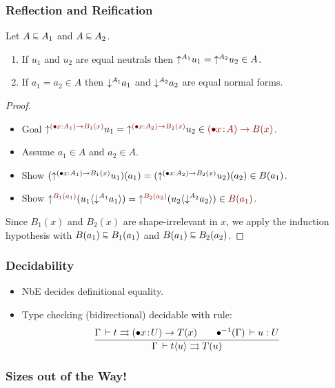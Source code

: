 \documentclass[t]{beamer}
\newcommand{\irr}{\mathord{\bullet}}
\renewcommand{\erhyp}[3][\irr]{#1#2 \of #3}
\renewcommand{\erfunT}[4][\irr]{(\erhyp[#1]{#2}{#3}) \to #4}
\newcommand{\serfunT}[4][\irr]{(#1#2 : #3) \to #4}
\renewcommand{\resurrect}[1]{\irr^{-1}(#1)}
\begin{document}
\begin{frame}%
  \frametitle{Reflection and Reification}
  \begin{theorem}
    Let $A \shape A_1$ and $A \shape A_2$.
    \begin{enumerate}
    \item If $u_1$ and $u_2$ are equal neutrals then $\mathord{\uparrow^{A_1}} u_1 = \mathord{\uparrow^{A_2}} u_2 \in A$.
    \item If $a_1 = a_2 \in A$ then $\mathord{\downarrow^{A_1}} a_1$ and $\mathord{\downarrow^{A_2}} a_2$ are equal normal forms.
    \end{enumerate}
  \end{theorem}
  \begin{proof}
    \begin{itemize}
    \item
    Goal $\up{\color{darkred}\serfunT x {A_1}{B_1(x)}} u_1 = \up{\color{darkred}\serfunT x {A_2}{B_2(x)}} u_2 \in \color{darkred}\erfunT x A {B(x)}$.
    \item
    Assume $a_1 \in A$ and $a_2 \in A$.
    \item
    Show $(\up{\serfunT x {A_1}{B_1(x)}} u_1)(a_1) = (\up{\serfunT x {A_2}{B_2(x)}} u_2)(a_2) \in B(a_1)$.
    \item
    Show $\up{\color{darkred}B_1(a_1)} (u_1 \ann {\down{A_1} a_1}) = \up{\color{darkred}B_2(a_2)} (u_2 \ann {\down{A_2}a_2}) \in \color{darkred}B(a_1)$.
    \end{itemize}
    Since $B_1(x)$ and $B_2(x)$ are shape-irrelevant in $x$, we apply the induction hypothesis with
    $B(a_1) \shape B_1(a_1)$ and $B(a_1) \shape B_2(a_2)$.
  \end{proof}
\end{frame}


\begin{frame}%
  \frametitle{Decidability}
  \begin{itemize}
  \item NbE decides definitional equality.
  \item Type checking (bidirectional) decidable with rule:
\[
  \ru{\Gamma \der t \jinf \erfunT x U T(x) \qquad
      \resurrect \Gamma \der u : U
    }{\Gamma \der t \ann u \jinf T(u)}
\]
  \end{itemize}
\end{frame}

\begin{frame}[fragile=singleslide]
  \frametitle{Sizes out of the Way!}
\vspace{-3ex}

\aOpt \\[1ex]
\aNat \\[2ex]

\aPredTy \\[2ex]

\aMonus
\end{frame}
\end{document}
